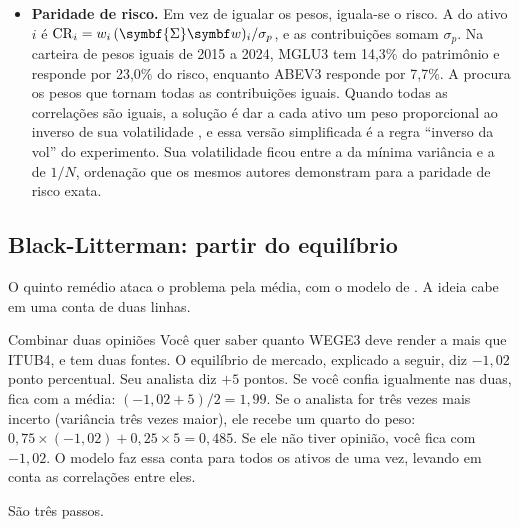 \begin{itemize}[itemsep=4pt]
  \item \textbf{Paridade de risco.} Em vez de igualar os pesos, iguala-se o risco. A  do ativo $i$ é $\mathrm{CR}_i = w_i\,(\symbf{\Sigma}\vetor{w})_i/\sigma_p$, e as contribuições somam $\sigma_p$. Na carteira de pesos iguais de 2015 a 2024, MGLU3 tem 14,3\% do patrimônio e responde por 23,0\% do risco, enquanto ABEV3 responde por 7,7\%. A  procura os pesos que tornam todas as contribuições iguais. Quando todas as correlações são iguais, a solução é dar a cada ativo um peso proporcional ao inverso de sua volatilidade \citep{maillard2010}, e essa versão simplificada é a regra ``inverso da vol'' do experimento. Sua volatilidade ficou entre a da mínima variância e a de $1/N$, ordenação que os mesmos autores demonstram para a paridade de risco exata.
\end{itemize}

\subsection{Black-Litterman: partir do equilíbrio}

O quinto remédio ataca o problema pela média, com o modelo de \citet{black1992}. A ideia cabe em uma conta de duas linhas.

\begin{exemplo}{Combinar duas opiniões}
Você quer saber quanto WEGE3 deve render a mais que ITUB4, e tem duas fontes. O equilíbrio de mercado, explicado a seguir, diz $-1,02$ ponto percentual. Seu analista diz $+5$ pontos. Se você confia igualmente nas duas, fica com a média: $(-1,02 + 5)/2 = 1,99$. Se o analista for três vezes mais incerto (variância três vezes maior), ele recebe um quarto do peso: $0,75 \times (-1,02) + 0,25 \times 5 = 0,485$. Se ele não tiver opinião, você fica com $-1,02$. O modelo faz essa conta para todos os ativos de uma vez, levando em conta as correlações entre eles.
\end{exemplo}

São três passos.

